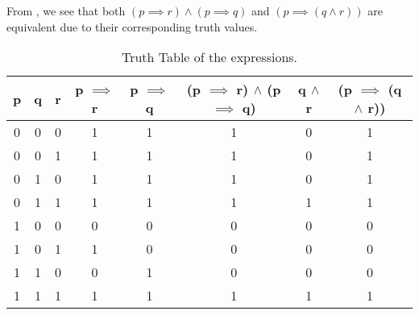 %
%

\begin{subquestions}


\subquestion

\begin{subsubquestions}
	
\subsubquestion

From , we see that both $(p \implies r) \land (p \implies q)$ and $(p \implies (q \land r))$ are equivalent due to their corresponding truth values.
\begin{table}[ht]
	\centering
	\begin{tabular}{|c|c|c|c|c|c|c|c|}
		\hline
		p & q & r & p $\implies$ r & p $\implies$ q & (p $\implies$ r) $\land$ (p $\implies$ q) & q $\land$ r & (p $\implies$ (q $\land$ r)) \\
		\hline
		0 & 0 & 0 & 1 & 1 & 1 & 0 & 1 \\
		0 & 0 & 1 & 1 & 1 & 1 & 0 & 1 \\
		0 & 1 & 0 & 1 & 1 & 1 & 0 & 1 \\
		0 & 1 & 1 & 1 & 1 & 1 & 1 & 1 \\
		1 & 0 & 0 & 0 & 0 & 0 & 0 & 0 \\
		1 & 0 & 1 & 1 & 0 & 0 & 0 & 0  \\
		1 & 1 & 0 & 0 & 1 & 0 & 0 & 0 \\
		1 & 1 & 1 & 1 & 1 & 1 & 1 & 1 \\
		\hline
	\end{tabular}
\caption{\label{2012:q2:TruthTab1} Truth Table of the expressions.}
\end{table}


\subsubquestion


\end{subsubquestions}
\end{subquestions}
